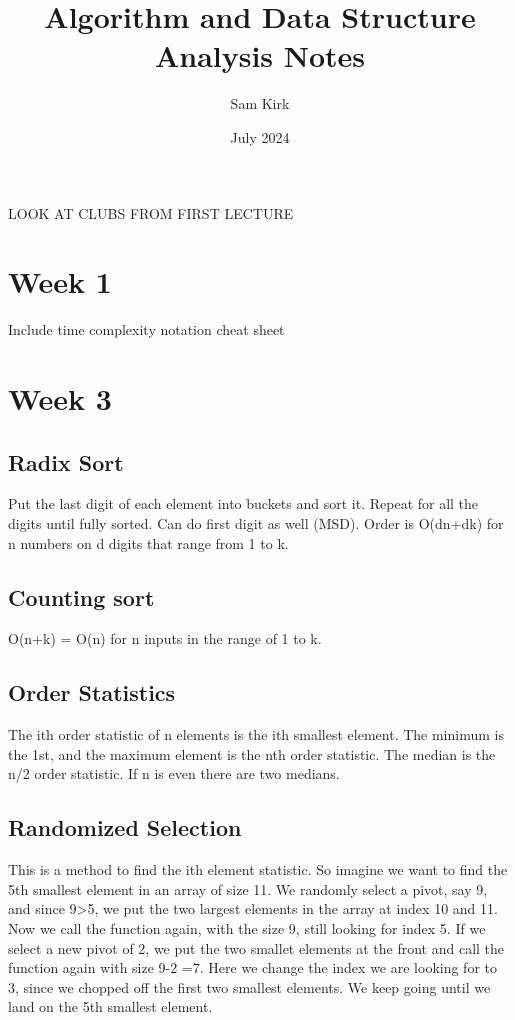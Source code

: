 \documentclass[12pt, letterpaper]{article}
\title{Algorithm and Data Structure Analysis Notes}
\author{Sam Kirk}
\date{July 2024}
\begin{document}
\maketitle

LOOK AT CLUBS FROM FIRST LECTURE  

\section*{Week 1}
Include time complexity notation cheat sheet 

\section*{Week 3}
\subsection*{Radix Sort}
Put the last digit of each element into buckets and sort it. 
Repeat for all the digits until fully sorted. Can do first digit 
as well (MSD). Order is O(dn+dk) for n numbers on d digits 
that range from 1 to k. 

\subsection*{Counting sort}
O(n+k) = O(n) for n inputs in the range of 1 to k.  

\subsection*{Order Statistics}
The ith order statistic of n elements is the ith smallest element. 
The minimum is the 1st, and the maximum element is the nth order 
statistic. The median is the n/2 order statistic. If n is even there 
are two medians. 

\subsection*{Randomized Selection}
This is a method to find the ith element statistic. 
So imagine we want to find the 5th smallest element in an array of 
size 11. We randomly select a pivot, say 9, and since 9>5, we 
put the two largest elements in the array at index 10 and 11. 
Now we call the function again, with the size 9, still looking for 
index 5. If we select a new pivot of 2, we put the two smallet 
elements at the front and call the function again with size 9-2 =7. 
Here we change the index we are looking for to 3, since we chopped 
off the first two smallest elements. We keep going until we land 
on the 5th smallest element. 
\end{document}
